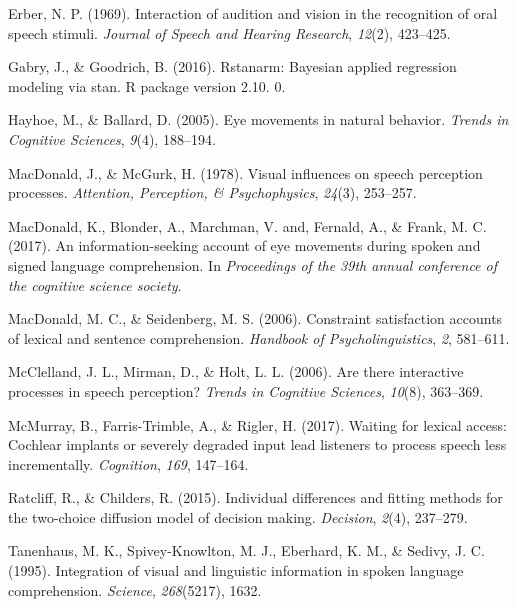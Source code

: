 \documentclass[10pt, letterpaper]{article}
\begin{document}
\leavevmode\hypertarget{ref-erber1969interaction}{}%
Erber, N. P. (1969). Interaction of audition and vision in the
recognition of oral speech stimuli. \emph{Journal of Speech and Hearing
Research}, \emph{12}(2), 423--425.

\leavevmode\hypertarget{ref-gabry2016rstanarm}{}%
Gabry, J., \& Goodrich, B. (2016). Rstanarm: Bayesian applied regression
modeling via stan. R package version 2.10. 0.

\leavevmode\hypertarget{ref-hayhoe2005eye}{}%
Hayhoe, M., \& Ballard, D. (2005). Eye movements in natural behavior.
\emph{Trends in Cognitive Sciences}, \emph{9}(4), 188--194.

\leavevmode\hypertarget{ref-macdonald1978visual}{}%
MacDonald, J., \& McGurk, H. (1978). Visual influences on speech
perception processes. \emph{Attention, Perception, \& Psychophysics},
\emph{24}(3), 253--257.

\leavevmode\hypertarget{ref-macdonald2017info}{}%
MacDonald, K., Blonder, A., Marchman, V. and, Fernald, A., \& Frank, M.
C. (2017). An information-seeking account of eye movements during spoken
and signed language comprehension. In \emph{Proceedings of the 39th
annual conference of the cognitive science society}.

\leavevmode\hypertarget{ref-macdonald2006constraint}{}%
MacDonald, M. C., \& Seidenberg, M. S. (2006). Constraint satisfaction
accounts of lexical and sentence comprehension. \emph{Handbook of
Psycholinguistics}, \emph{2}, 581--611.

\leavevmode\hypertarget{ref-mcclelland2006there}{}%
McClelland, J. L., Mirman, D., \& Holt, L. L. (2006). Are there
interactive processes in speech perception? \emph{Trends in Cognitive
Sciences}, \emph{10}(8), 363--369.

\leavevmode\hypertarget{ref-mcmurray2017waiting}{}%
McMurray, B., Farris-Trimble, A., \& Rigler, H. (2017). Waiting for
lexical access: Cochlear implants or severely degraded input lead
listeners to process speech less incrementally. \emph{Cognition},
\emph{169}, 147--164.

\leavevmode\hypertarget{ref-ratcliff2015individual}{}%
Ratcliff, R., \& Childers, R. (2015). Individual differences and fitting
methods for the two-choice diffusion model of decision making.
\emph{Decision}, \emph{2}(4), 237--279.

\leavevmode\hypertarget{ref-tanenhaus1995integration}{}%
Tanenhaus, M. K., Spivey-Knowlton, M. J., Eberhard, K. M., \& Sedivy, J.
C. (1995). Integration of visual and linguistic information in spoken
language comprehension. \emph{Science}, \emph{268}(5217), 1632.
\end{document}
